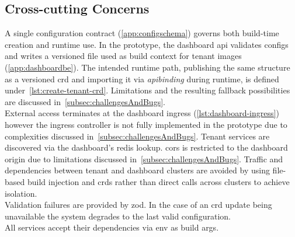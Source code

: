 \documentclass[11pt, a4paper, oneside, listof=totoc]{scrartcl}
\begin{document}
        \subsection{Cross-cutting Concerns}\label{subsec:crossCuttingConcerns}
            A single configuration contract (\autoref{app:configschema}) governs both build-time
            creation and runtime use.
            In the prototype, the dashboard \gls{api} validates configs and writes a versioned file
            used as build context for tenant images (\autoref{app:dashboardbe}).
            The intended runtime path, publishing the same structure as a versioned \gls{crd} and
            importing it via \emph{\gls{apibinding}} during runtime, is defined
            under~\autoref{lst:create-tenant-crd}.
            Limitations and the resulting fallback possibilities are discussed
            in~\autoref{subsec:challengesAndBugs}.\\
            External access terminates at the dashboard \gls{ingress} (\autoref{lst:dashboard-ingress})
            however the \gls{ingress} controller is not fully implemented in the prototype due to
            complexities discussed in~\autoref{subsec:challengesAndBugs}.
            Tenant services are discovered via the dashboard's \gls{redis} lookup.
            \gls{cors} is restricted to the dashboard origin due to limitations discussed
            in~\autoref{subsec:challengesAndBugs}.
            Traffic and dependencies between tenant and dashboard clusters are avoided by using
            file-based build injection and \glspl{crd} rather than direct calls across clusters
            to achieve isolation.\\
            Validation failures are provided by zod.
            In the case of an \gls{crd} update being unavailable the system degrades to the last
            valid configuration.\\
            All services accept their dependencies via env as build args.
\end{document}
